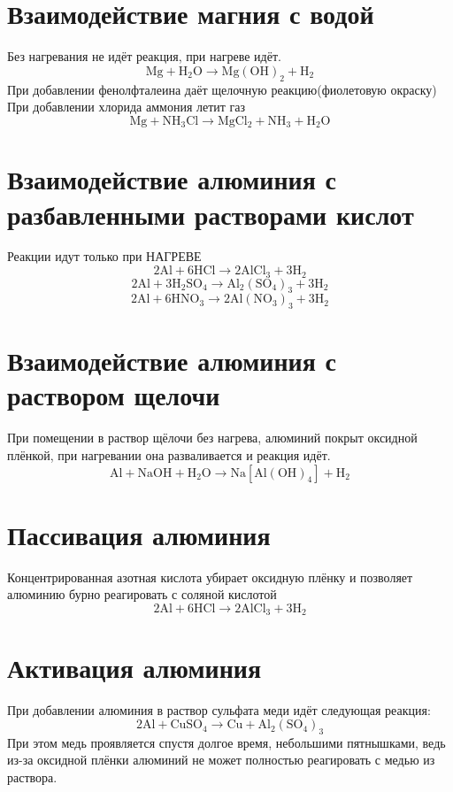 \documentclass[a4paper,12pt]{article}
\begin{document}
\section{Взаимодействие магния с водой}
Без нагревания не идёт реакция, при нагреве идёт.
\begin{equation} 
\mathrm{Mg + H_2O \longrightarrow Mg(OH)_2 + H_2} 
\end{equation}
При добавлении фенолфталеина даёт щелочную реакцию(фиолетовую окраску)
При добавлении хлорида аммония летит газ
\begin{equation} 
\mathrm{Mg + NH_3Cl \longrightarrow MgCl_2 + NH_3 + H_2O} 
\end{equation}
\section{Взаимодействие алюминия с разбавленными растворами кислот}
Реакции идут только при НАГРЕВЕ
\begin{equation} 
\mathrm{2Al + 6HCl \longrightarrow 2AlCl_3 + 3H_2} 
\end{equation}
\begin{equation} 
\mathrm{2Al + 3H_2SO_4 \longrightarrow Al_2(SO_4)_3 + 3H_2} 
\end{equation}
\begin{equation} 
\mathrm{2Al + 6HNO_3 \longrightarrow 2Al(NO_3)_3 + 3H_2} 
\end{equation}
\section{Взаимодействие алюминия с раствором щелочи}
При помещении в раствор щёлочи без нагрева, алюминий покрыт оксидной плёнкой, при нагревании она разваливается и реакция идёт.
\begin{equation} 
\mathrm{Al + NaOH + H_2O \longrightarrow Na[Al(OH)_4] + H_2}
\end{equation}
\section{Пассивация алюминия}
Концентрированная азотная кислота убирает оксидную плёнку и позволяет алюминию бурно реагировать с соляной кислотой
\begin{equation} 
\mathrm{2Al + 6HCl \longrightarrow 2AlCl_3 + 3H_2} 
\end{equation}
\section{Активация алюминия}
При добавлении алюминия в раствор сульфата меди идёт следующая реакция:
\begin{equation} 
\mathrm{2Al + CuSO_4 \longrightarrow Cu + Al_2(SO_4)_3} 
\end{equation}
При этом медь проявляется спустя долгое время, небольшими пятнышками, ведь из-за оксидной плёнки алюминий не может полностью реагировать с медью из раствора.
\end{document}
